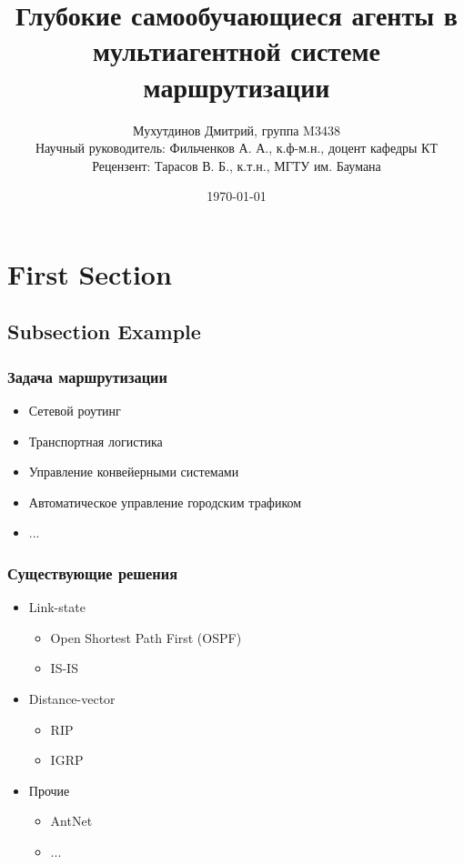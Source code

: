 \documentclass{beamer}
\title[DQN-routing]{Глубокие самообучающиеся агенты в мультиагентной системе маршрутизации}
\author[Дмитрий Мухутдинов, М3438]{
    Мухутдинов Дмитрий, группа M3438 \\
    Научный руководитель: Фильченков А. А., к.ф-м.н., доцент кафедры КТ \\
    Рецензент: Тарасов В. Б., к.т.н., МГТУ им. Баумана
}%
\institute[ИТМО] %
{
    Кафедра Компьютерных Технологий \\
    Факультет Информационных Технологий и Программирования \\
    Университет ИТМО, Санкт-Петербург
}
\date{\today} %
\begin{document}
\frame{\titlepage}


\section{First Section} 

\subsection{Subsection Example} %

\begin{frame}
  \frametitle{Задача маршрутизации}
  \begin{itemize}
  \item Сетевой роутинг
  \item Транспортная логистика
  \item Управление конвейерными системами
  \item Автоматическое управление городским трафиком
  \item ...
  \end{itemize}
\end{frame}


\begin{frame}
  \frametitle{Существующие решения}
  \begin{itemize}
  \item Link-state
    \begin{itemize}
    \item Open Shortest Path First (OSPF)
    \item IS-IS
    \end{itemize}
  \item Distance-vector
    \begin{itemize}
    \item RIP
    \item IGRP
    \end{itemize}
  \item Прочие
    \begin{itemize}
    \item AntNet
    \item ...
    \end{itemize}
  \end{itemize}
\end{frame}
\end{document}
